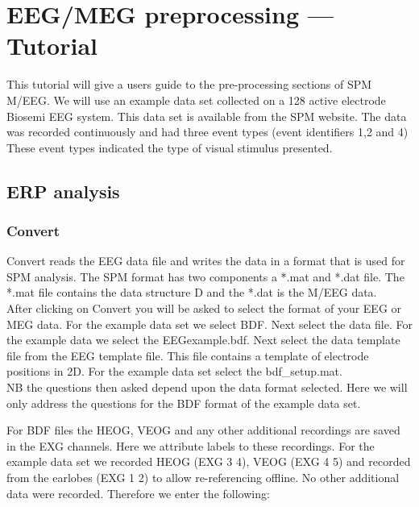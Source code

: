 \chapter{EEG/MEG preprocessing --- Tutorial}
\label{ch:eeg_tutorial}
This tutorial will give a users guide to the pre-processing sections
of SPM M/EEG. We will use an example data set collected on a 128 active
electrode Biosemi EEG system. This data set is available from the SPM
website. The data was recorded continuously and had three event types
(event identifiers 1,2 and 4) These event types indicated the type of
visual stimulus presented.

\section{ERP analysis}

\subsection{Convert}
Convert reads the EEG data file and writes the data in a format that
is used for SPM analysis. The SPM format has two components a *.mat
and *.dat file. The *.mat file contains the data structure D and the
*.dat is the M/EEG data.\\

After clicking on Convert you will be asked to select the format of
your EEG or MEG data. For the example data set we select BDF. Next
select the data file. For the example data we select the
EEGexample.bdf. Next select the data template file from the EEG
template file. This file contains a template of electrode positions in
2D. For the example data set select the bdf\_setup.mat.\\

NB the questions then asked depend upon the data format selected. Here
we will only address the questions for the BDF format of the example
data set. 

For BDF files the HEOG, VEOG and any other additional recordings are
saved in the EXG channels. Here we attribute labels to these
recordings. For the example data set we recorded HEOG (EXG 3 4), VEOG
(EXG 4 5) and recorded from the earlobes (EXG 1 2) to allow
re-referencing offline. No other additional data were
recorded. Therefore we enter the following:

